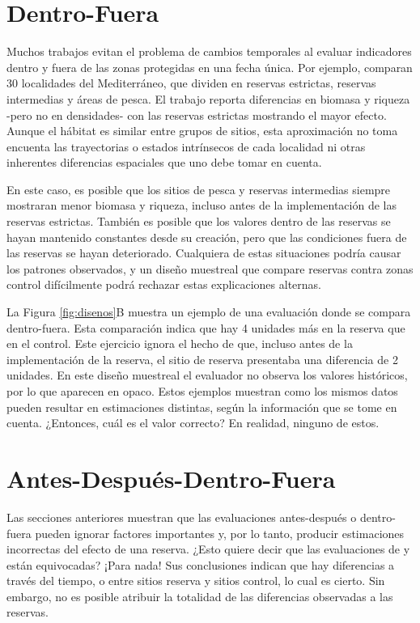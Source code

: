 \documentclass[]{krantz}
\begin{document}
\hypertarget{dentro-fuera}{%
\section{Dentro-Fuera}\label{dentro-fuera}}

Muchos trabajos evitan el problema de cambios temporales al evaluar
indicadores dentro y fuera de las zonas protegidas en una fecha única.
Por ejemplo, \citet{guidetti_2014} comparan 30 localidades del
Mediterráneo, que dividen en reservas estrictas, reservas intermedias y
áreas de pesca. El trabajo reporta diferencias en biomasa y riqueza
-pero no en densidades- con las reservas estrictas mostrando el mayor
efecto. Aunque el hábitat es similar entre grupos de sitios, esta
aproximación no toma encuenta las trayectorias o estados intrínsecos de
cada localidad ni otras inherentes diferencias espaciales que uno debe
tomar en cuenta.

En este caso, es posible que los sitios de pesca y reservas intermedias
siempre mostraran menor biomasa y riqueza, incluso antes de la
implementación de las reservas estrictas. También es posible que los
valores dentro de las reservas se hayan mantenido constantes desde su
creación, pero que las condiciones fuera de las reservas se hayan
deteriorado. Cualquiera de estas situaciones podría causar los patrones
observados, y un diseño muestreal que compare reservas contra zonas
control difícilmente podrá rechazar estas explicaciones alternas.

La Figura \ref{fig:disenos}B muestra un ejemplo de una evaluación donde
se compara dentro-fuera. Esta comparación indica que hay 4 unidades más
en la reserva que en el control. Este ejercicio ignora el hecho de que,
incluso antes de la implementación de la reserva, el sitio de reserva
presentaba una diferencia de 2 unidades. En este diseño muestreal el
evaluador no observa los valores históricos, por lo que aparecen en
opaco. Estos ejemplos muestran como los mismos datos pueden resultar en
estimaciones distintas, según la información que se tome en cuenta.
¿Entonces, cuál es el valor correcto? En realidad, ninguno de estos.

\hypertarget{antes-despues-dentro-fuera}{%
\section{Antes-Después-Dentro-Fuera}\label{antes-despues-dentro-fuera}}

Las secciones anteriores muestran que las evaluaciones antes-después o
dentro-fuera pueden ignorar factores importantes y, por lo tanto,
producir estimaciones incorrectas del efecto de una reserva. ¿Esto
quiere decir que las evaluaciones de \citet{wantiez_1997} y
\citet{guidetti_2014} están equivocadas? ¡Para nada! Sus conclusiones
indican que hay diferencias a través del tiempo, o entre sitios reserva
y sitios control, lo cual es cierto. Sin embargo, no es posible atribuir
la totalidad de las diferencias observadas a las reservas.
\end{document}
